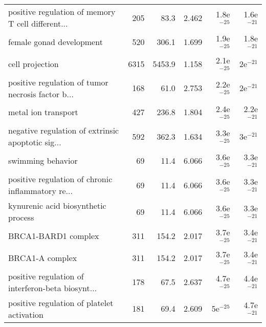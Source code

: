\begin{longtable}{lrrrrr}
 positive regulation of memory T cell different... &                     205 &                    83.3 &      2.462 &         1.8e$^{-25}$ &         1.6e$^{-21}$ \\
                          female gonad development &                     520 &                   306.1 &      1.699 &         1.9e$^{-25}$ &         1.8e$^{-21}$ \\
                                   cell projection &                    6315 &                  5453.9 &      1.158 &         2.1e$^{-25}$ &           2e$^{-21}$ \\
 positive regulation of tumor necrosis factor b... &                     168 &                    61.0 &      2.753 &         2.2e$^{-25}$ &           2e$^{-21}$ \\
                               metal ion transport &                     427 &                   236.8 &      1.804 &         2.4e$^{-25}$ &         2.2e$^{-21}$ \\
 negative regulation of extrinsic apoptotic sig... &                     592 &                   362.3 &      1.634 &         3.3e$^{-25}$ &           3e$^{-21}$ \\
                                 swimming behavior &                      69 &                    11.4 &      6.066 &         3.6e$^{-25}$ &         3.3e$^{-21}$ \\
 positive regulation of chronic inflammatory re... &                      69 &                    11.4 &      6.066 &         3.6e$^{-25}$ &         3.3e$^{-21}$ \\
               kynurenic acid biosynthetic process &                      69 &                    11.4 &      6.066 &         3.6e$^{-25}$ &         3.3e$^{-21}$ \\
                               BRCA1-BARD1 complex &                     311 &                   154.2 &      2.017 &         3.7e$^{-25}$ &         3.4e$^{-21}$ \\
                                   BRCA1-A complex &                     311 &                   154.2 &      2.017 &         3.7e$^{-25}$ &         3.4e$^{-21}$ \\
 positive regulation of interferon-beta biosynt... &                     178 &                    67.5 &      2.637 &         4.7e$^{-25}$ &         4.4e$^{-21}$ \\
        positive regulation of platelet activation &                     181 &                    69.4 &      2.609 &           5e$^{-25}$ &         4.7e$^{-21}$ \\

\end{longtable}
